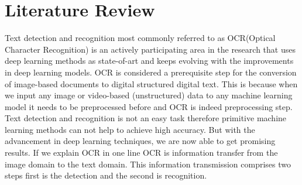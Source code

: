 \setlength{\footskip}{8mm}

\chapter{Literature Review}
\label{ch:literature-review}

Text detection and recognition most commonly referred to as OCR(Optical Character Recognition) is an actively participating area in the research that uses deep learning methods as state-of-art and keeps evolving with the improvements in deep learning models. \cite{history} OCR is considered a prerequisite step for the conversion of image-based documents to digital structured digital text. This is because when we input any image or video-based (unstructured) data to any machine learning model it needs to be preprocessed before and OCR is indeed preprocessing step. \cite{real-world} Text detection and recognition is not an easy task therefore primitive machine learning methods can not help to achieve high accuracy. But with the advancement in deep learning techniques, we are now able to get promising results.
If we explain OCR in one line OCR is information transfer from the image domain to the text domain. This information transmission comprises two steps first is the detection and the second is recognition.

